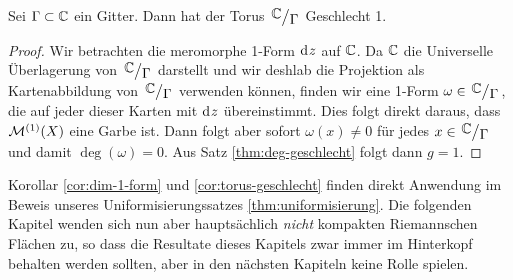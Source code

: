 \begin{cor}
  \label{cor:torus-geschlecht}
  Sei $\Gamma \subset \mathbb{C}$ ein Gitter. Dann hat der Torus
  $\quot{\C}{\Gamma}$ Geschlecht 1.
\end{cor}

\begin{proof}
  Wir betrachten die meromorphe 1-Form $\d[z]$ auf $\mathbb{C}$. Da $\mathbb{C}$ die
  Universelle Überlagerung von $\quot{\C}{\Gamma}$ darstellt und wir
  deshlab die Projektion als Kartenabbildung von $\quot{\C}{\Gamma}$
  verwenden können, finden wir eine 1-Form $\omega \in
  \quot{\C}{\Gamma}$, die auf jeder dieser Karten mit $\d[z]$
  übereinstimmt. Dies folgt direkt daraus, dass $\mathcal{M}^{(1)}(X)$ eine
  Garbe ist. Dann folgt aber sofort $\omega(x) \neq 0$ für jedes $x
  \in \quot{\C}{\Gamma}$ und damit $\deg(\omega) = 0$. Aus Satz
  \ref{thm:deg-geschlecht} folgt dann $g = 1$.
\end{proof}


Korollar \ref{cor:dim-1-form} und \ref{cor:torus-geschlecht} finden
direkt Anwendung im Beweis unseres Uniformisierungssatzes
\ref{thm:uniformisierung}. Die folgenden Kapitel wenden sich nun aber
hauptsächlich \emph{nicht} kompakten Riemannschen Flächen zu, so dass
die Resultate dieses Kapitels zwar immer im Hinterkopf behalten werden
sollten, aber in den nächsten Kapiteln keine Rolle spielen.


